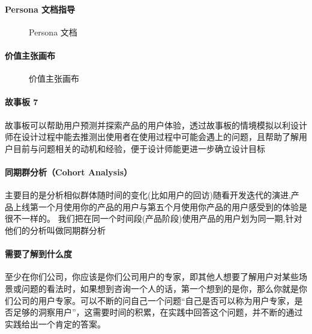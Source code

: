 \documentclass[letterpaper,11pt,english]{sphinxmanual}
\begin{document}
\paragraph{Persona 文档指导}
\label{\detokenize{chapter_skill/users_analysis:persona}}
\begin{figure}[H]
\centering
\capstart

\noindent{}
\caption{Persona 文档}\label{\detokenize{chapter_skill/users_analysis:id28}}\end{figure}


\paragraph{价值主张画布}
\label{\detokenize{chapter_skill/users_analysis:id12}}
\begin{figure}[H]
\centering
\capstart

\noindent{}
\caption{价值主张画布}\label{\detokenize{chapter_skill/users_analysis:id29}}\end{figure}


\paragraph{故事板 7\sphinxfootnotemark[157]}
\label{\detokenize{chapter_skill/users_analysis:id13}}%
\begin{footnotetext}[157]\sphinxAtStartFootnote
{}
%
\end{footnotetext}\ignorespaces 
故事板可以帮助用户预测并探索产品的用户体验，透过故事板的情境模拟以利设计师在设计过程中能去推测出使用者在使用过程中可能会遇上的问题，且帮助了解用户目前与问题相关的动机和经验，便于设计师能更进一步确立设计目标


\paragraph{同期群分析（Cohort Analysis）}
\label{\detokenize{chapter_skill/users_analysis:cohort-analysis}}
主要目的是分析相似群体随时间的变化(比如用户的回访)随看开发迭代的演进,产品上线第一个月使用你的产品的用户与第五个月使用你产品的用户感受到的体验是很不一样的。
我们把在同一个时间段(产品阶段)使用产品的用户划为同一期,针对他们的分析叫做同期群分析


\paragraph{需要了解到什么度}
\label{\detokenize{chapter_skill/users_analysis:id14}}
至少在你们公司，你应该是你们公司用户的专家，即其他人想要了解用户对某些场景或问题的看法时，如果想到咨询一个人的话，第一个想到的是你，那么你就是你们公司的用户专家。可以不断的问自己一个问题“自己是否可以称为用户专家，是否足够的洞察用户”，这需要时间的积累，在实践中回答这个问题，并不断的通过实践给出一个肯定的答案。
\end{document}
